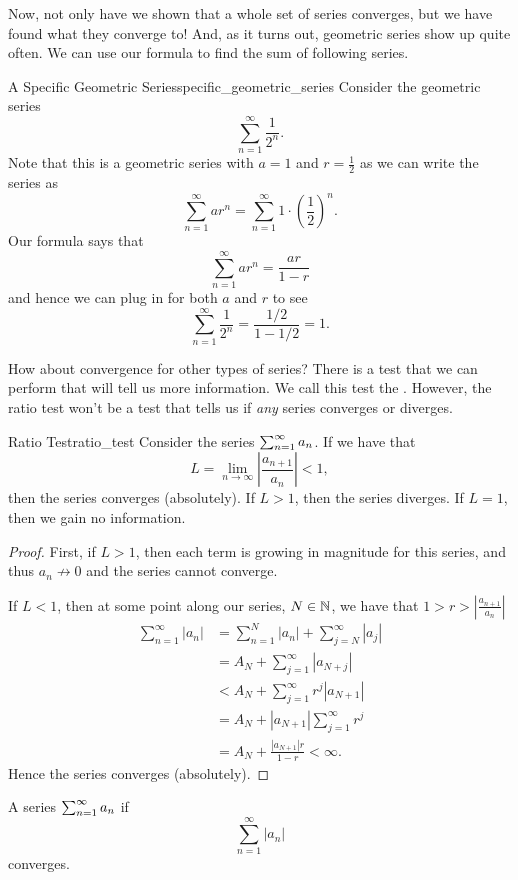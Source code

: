 Now, not only have we shown that a whole set of series converges, but we have found what they converge to! And, as it turns out, geometric series show up quite often.  We can use our formula to find the sum of following series.

\begin{ex}{A Specific Geometric Series}{specific_geometric_series}
Consider the geometric series
\[
\sum_{n=1}^\infty \frac{1}{2^n}.
\]
Note that this is a geometric series with $a=1$ and $r=\frac{1}{2}$ as we can write the series as
\[
\sum_{n=1}^\infty a r^n = \sum_{n=1}^\infty 1\cdot \left( \frac{1}{2}\right)^n.
\]
Our formula says that
\[
\sum_{n=1}^\infty ar^n = \frac{ar}{1-r}
\]
and hence we can plug in for both $a$ and $r$ to see
\[
\boxed{\sum_{n=1}^\infty \frac{1}{2^n}=\frac{1/2}{1-1/2}=1.}
\]
\end{ex}

How about convergence for other types of series? There is a test that we can perform that will tell us more information.  We call this test the . However, the ratio test won't be a test that tells us if \emph{any} series converges or diverges.

\begin{prop}{Ratio Test}{ratio_test}
Consider the series $\sum_{n=1}^\infty a_n$. If we have that 
\[
L=\lim_{n\to \infty}\left| \frac{a_{n+1}}{a_n}\right|<1,
\]
then the series converges (absolutely).  If $L>1$, then the series diverges.  If $L=1$, then we gain no information.
\begin{proof}
First, if $L>1$, then each term is growing in magnitude for this series, and thus $a_n\not\to 0$ and the series cannot converge.

If $L<1$, then at some point along our series, $N\in \mathbb{N}$, we have that $1>r>\left| \frac{a_{n+1}}{a_n}\right|$
\begin{align*}
\sum_{n=1}^\infty |a_n| &= \sum_{n=1}^N |a_n| + \sum_{j=N}^\infty |a_j|\\
&= A_N + \sum_{j=1}^\infty |a_{N+j}|\\
&< A_N + \sum_{j=1}^\infty r^j |a_{N+1}|\\
&= A_N +|a_{N+1}| \sum_{j=1}^\infty r^j\\
&= A_N + \frac{|a_{N+1}|r}{1-r}<\infty.
\end{align*}
Hence the series converges (absolutely).
\end{proof}
\end{prop}

\begin{remark}
A series $\sum_{n=1}^\infty a_n$  if 
\[
\sum_{n=1}^\infty |a_n| 
\]
converges.
\end{remark}


